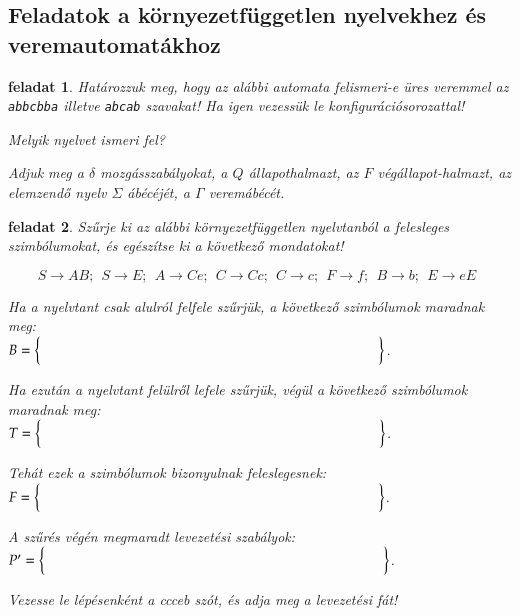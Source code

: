 \documentclass[a4paper]{article}
\newtheorem{feladat}{feladat}[section]
\begin{document}
\newpage
\subsection{Feladatok a környezetfüggetlen nyelvekhez és veremautomatákhoz}

\begin{feladat}{}
Határozzuk meg, hogy az alábbi automata felismeri-e üres veremmel az
\verb|abbcbba| illetve \verb+abcab+ szavakat!
Ha igen vezessük le konfigurációsorozattal!

Melyik nyelvet ismeri fel?

Adjuk meg a $\delta$  mozgásszabályokat, a $Q$ állapothalmazt, az $F$
végállapot-halmazt, az elemzendő nyelv $\Sigma$ ábécéjét, a $\Gamma$ veremábécét.

\end{feladat}


\begin{feladat}{43}
Szűrje ki az alábbi környezetfüggetlen nyelvtanból a felesleges
szimbólumokat, és egészítse ki a következő mondatokat!

\vspace{2em}
\[ S\rightarrow AB;\:\: S\rightarrow E;\:\: A\rightarrow Ce;\:\: C\rightarrow Cc;\:\: C\rightarrow c;\:\: F\rightarrow f;\:\: B\rightarrow b;\:\: E\rightarrow eE\:\: \]

Ha a nyelvtant csak alulról felfele szűrjük, a következő szimbólumok
maradnak meg:\\
$B=\left\{\rule{0pt}{1.2em}\hspace{.7\linewidth}\right\}$.

Ha ezután a nyelvtant felülről lefele szűrjük, végül a következő szimbólumok
maradnak meg:\\
$T=\left\{\rule{0pt}{1.2em}\hspace{.7\linewidth}\right\}$.

Tehát ezek a szimbólumok bizonyulnak feleslegesnek:\\
$F=\left\{\rule{0pt}{1.2em}\hspace{.7\linewidth}\right\}$.

A szűrés végén megmaradt levezetési szabályok:\\[1ex]
$P'=\left\{\rule{0pt}{1.2em}\hspace{.7\linewidth}\right\}$.

Vezesse le lépésenként a ccceb szót, és adja meg a levezetési
fát!
\end{feladat}
\vfill
\end{document}
